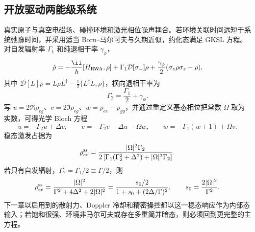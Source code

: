 \subsection{开放驱动两能级系统}

真实原子与真空电磁场、碰撞环境和激光相位噪声耦合。若环境关联时间远短于系统弛豫时间，并采用适当 Born--马尔可夫与久期近似，约化态满足 GKSL 方程。对自发辐射率 $\Gamma_1$ 和纯退相干率 $\gamma_\phi$，
\begin{equation}
\dot\rho
=-\frac{\ii}{\hbar}[H_{\rm RWA},\rho]
+\Gamma_1\mathcal D[\sigma_-]\rho
+\frac{\gamma_\phi}{2}(\sigma_z\rho\sigma_z-\rho),
\label{eq:optical-bloch-master}
\end{equation}
其中 $\mathcal D[L]\rho=L\rho L^\dagger-\tfrac12\{L^\dagger L,\rho\}$，横向退相干率为
\[
\Gamma_2=\frac{\Gamma_1}{2}+\gamma_\phi.
\]
写 $u=2\Re\rho_{eg}$、$v=2\Im\rho_{eg}$、$w=\rho_{ee}-\rho_{gg}$，并通过重定义基态相位把常数 $\Omega$ 取为实数，可得光学 Bloch 方程
\begin{equation}
\dot u=-\Gamma_2u+\Delta v,
\qquad
\dot v=-\Gamma_2v-\Delta u-\Omega w,
\qquad
\dot w=-\Gamma_1(w+1)+\Omega v.
\label{eq:optical-bloch-equations}
\end{equation}
稳态激发占据为
\begin{equation}
\rho_{ee}^{\rm ss}
=\frac{|\Omega|^2\Gamma_2}
{2\left[\Gamma_1(\Gamma_2^2+\Delta^2)+|\Omega|^2\Gamma_2\right]}.
\label{eq:bloch-steady-excited}
\end{equation}
若只有自发辐射，$\Gamma_2=\Gamma_1/2\equiv\Gamma/2$，则
\begin{equation}
\rho_{ee}^{\rm ss}
=\frac{|\Omega|^2}{\Gamma^2+4\Delta^2+2|\Omega|^2}
=\frac{s_0/2}{1+s_0+(2\Delta/\Gamma)^2},
\qquad
s_0=\frac{2|\Omega|^2}{\Gamma^2}.
\label{eq:two-level-saturation}
\end{equation}
下一章以后用到的散射力、Doppler 冷却和精密操控都以这一稳态响应作为内部态输入；若饱和很强、环境非马尔可夫或存在多重简并暗态，则必须回到更完整的主方程。

